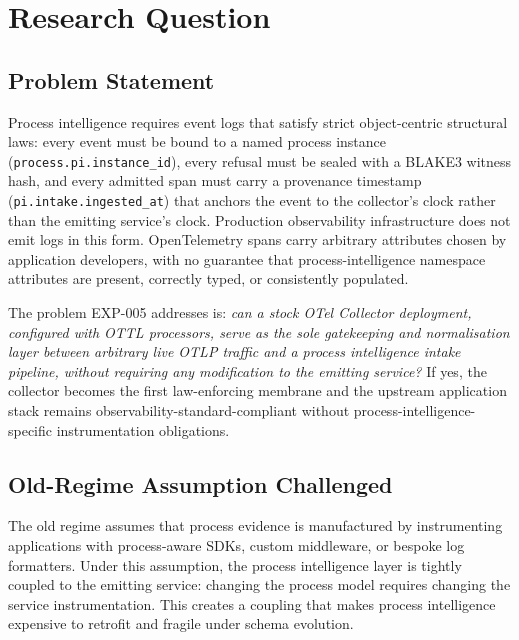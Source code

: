 \section{Research Question}
\label{sec:otel-weaver-exp-005-collector-to-intake-rq}

\subsection{Problem Statement}
\label{sec:otel-weaver-exp-005-collector-to-intake-rq-problem}

Process intelligence requires event logs that satisfy strict object-centric structural laws:
every event must be bound to a named process instance (\texttt{process.pi.instance\_id}),
every refusal must be sealed with a BLAKE3 witness hash, and every admitted span must carry
a provenance timestamp (\texttt{pi.intake.ingested\_at}) that anchors the event to the
collector's clock rather than the emitting service's clock. Production observability
infrastructure does not emit logs in this form. OpenTelemetry spans carry arbitrary
attributes chosen by application developers, with no guarantee that process-intelligence
namespace attributes are present, correctly typed, or consistently populated.

The problem EXP-005 addresses is: \textit{can a stock OTel Collector deployment, configured
with OTTL processors, serve as the sole gatekeeping and normalisation layer between arbitrary
live OTLP traffic and a process intelligence intake pipeline, without requiring any
modification to the emitting service?} If yes, the collector becomes the first law-enforcing
membrane and the upstream application stack remains observability-standard-compliant without
process-intelligence-specific instrumentation obligations.

\subsection{Old-Regime Assumption Challenged}
\label{sec:otel-weaver-exp-005-collector-to-intake-rq-old-regime}

The old regime assumes that process evidence is manufactured by instrumenting applications
with process-aware SDKs, custom middleware, or bespoke log formatters. Under this assumption,
the process intelligence layer is tightly coupled to the emitting service: changing the
process model requires changing the service instrumentation. This creates a coupling that
makes process intelligence expensive to retrofit and fragile under schema evolution.


